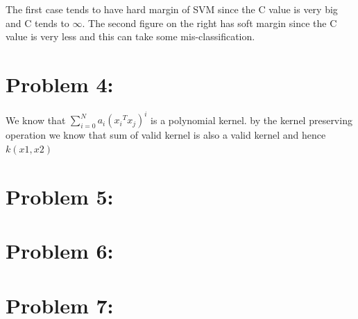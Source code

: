 \documentclass[5pt,a4paper]{article}
\begin{document}
The first case tends to have hard margin of SVM since the C value is very big and C tends to $\infty$. The second figure on the right has soft margin since the C value is very less and this can take some mis-classification.\\ 
	
	\section*{Problem 4:}
	We know that $ \sum_{i=0}^{N} a_i({x_i}^T {x_j})^i $ is a polynomial kernel. by the kernel preserving operation we know that sum of valid kernel is also a valid kernel and hence $k(x1,x2)$
	
	\section*{Problem 5:}
	\section*{Problem 6:}
	\section*{Problem 7:}
	
	
\end{document}
